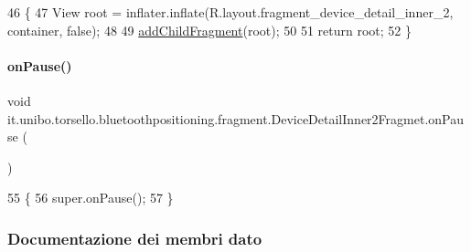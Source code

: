 \begin{DoxyCode}
46                                                                                                       \{
47         View root = inflater.inflate(R.layout.fragment\_device\_detail\_inner\_2, container, \textcolor{keyword}{false});
48 
49         \hyperlink{classit_1_1unibo_1_1torsello_1_1bluetoothpositioning_1_1fragment_1_1DeviceDetailInner2Fragmet_aa1467621600238fa5efde4a2cee901e0_aa1467621600238fa5efde4a2cee901e0}{addChildFragment}(root);
50 
51         \textcolor{keywordflow}{return} root;
52     \}
\end{DoxyCode}
\hypertarget{classit_1_1unibo_1_1torsello_1_1bluetoothpositioning_1_1fragment_1_1DeviceDetailInner2Fragmet_a4adf985f5dee5625553cdde770f82637_a4adf985f5dee5625553cdde770f82637}{}\label{classit_1_1unibo_1_1torsello_1_1bluetoothpositioning_1_1fragment_1_1DeviceDetailInner2Fragmet_a4adf985f5dee5625553cdde770f82637_a4adf985f5dee5625553cdde770f82637} 
\paragraph{\texorpdfstring{on\+Pause()}{onPause()}}
{\footnotesize\ttfamily void it.\+unibo.\+torsello.\+bluetoothpositioning.\+fragment.\+Device\+Detail\+Inner2\+Fragmet.\+on\+Pause (\begin{DoxyParamCaption}{ }\end{DoxyParamCaption})}


\begin{DoxyCode}
55                           \{
56         super.onPause();
57     \}
\end{DoxyCode}


\subsubsection{Documentazione dei membri dato}
\hypertarget{classit_1_1unibo_1_1torsello_1_1bluetoothpositioning_1_1fragment_1_1DeviceDetailInner2Fragmet_a8e8968fb34c3ad56d582196879b0ef6c_a8e8968fb34c3ad56d582196879b0ef6c}{}\label{classit_1_1unibo_1_1torsello_1_1bluetoothpositioning_1_1fragment_1_1DeviceDetailInner2Fragmet_a8e8968fb34c3ad56d582196879b0ef6c_a8e8968fb34c3ad56d582196879b0ef6c} 
